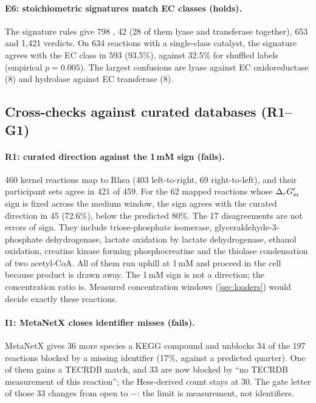 \paragraph{E6: stoichiometric signatures match EC classes (holds).}
The signature rules give 798 , 42  (28 of them lyase and transferase together), 653  and 1{,}421  verdicts.
On 634 reactions with a single-class catalyst, the signature agrees with the EC class in 593 (93.5\%), against 32.5\% for shuffled labels (empirical $p=0.005$).
The largest confusions are lyase against EC oxidoreductase (8) and hydrolase against EC transferase (8).

\subsection{Cross-checks against curated databases (R1--G1)}
\label{sec:res-db}

\paragraph{R1: curated direction against the 1\,mM sign (fails).}
460 kernel reactions map to Rhea (403 left-to-right, 69 right-to-left), and their participant sets agree in 421 of 459.
For the 62 mapped reactions whose $\Delta_r G'_{\mathrm{m}}$ sign is fixed across the medium window, the sign agrees with the curated direction in 45 (72.6\%), below the predicted 80\%.
The 17 disagreements are not errors of sign.
They include triose-phosphate isomerase, glyceraldehyde-3-phosphate dehydrogenase, lactate oxidation by lactate dehydrogenase, ethanol oxidation, creatine kinase forming phosphocreatine and the thiolase condensation of two acetyl-CoA.
All of them run uphill at 1\,mM and proceed in the cell because product is drawn away.
The 1\,mM sign is not a direction; the concentration ratio is.
Measured concentration windows (\cref{sec:loaders}) would decide exactly these reactions.

\paragraph{I1: MetaNetX closes identifier misses (fails).}
MetaNetX gives 36 more species a KEGG compound and unblocks 34 of the 197 reactions blocked by a missing identifier (17\%, against a predicted quarter).
One of them gains a TECRDB match, and 33 are now blocked by ``no TECRDB measurement of this reaction''; the Hess-derived count stays at 30.
The gate letter of those 33 changes from \textsf{open} to $-$: the limit is measurement, not identifiers.

